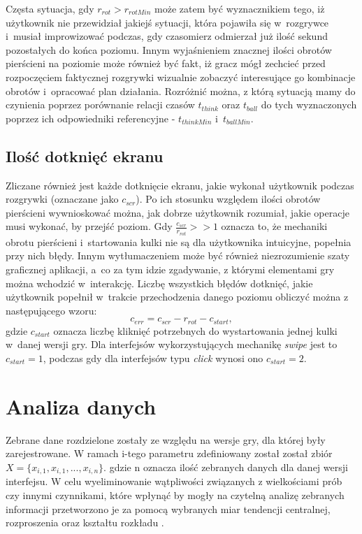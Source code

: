 \documentclass[a4paper,12pt,numbers=noenddot]{report}
\begin{document}
Częsta sytuacja, gdy $r_{rot} > r_{rotMin}$  może zatem być wyznacznikiem tego, iż użytkownik nie przewidział jakiejś sytuacji, która pojawiła się w~rozgrywce i~musiał improwizować podczas, gdy czasomierz odmierzał już ilość sekund pozostałych do końca poziomu. Innym wyjaśnieniem znacznej ilości obrotów pierścieni na poziomie może również być fakt, iż gracz mógł zechcieć przed rozpoczęciem faktycznej rozgrywki wizualnie zobaczyć interesujące go kombinacje obrotów i~opracować plan działania. Rozróżnić można, z którą sytuacją mamy do czynienia poprzez porównanie relacji czasów $t_{think}$ oraz $t_{ball}$ do tych wyznaczonych poprzez ich odpowiedniki referencyjne - $t_{thinkMin}$ i~$t_{ballMin}$.
	\subsection{Ilość dotknięć ekranu}
Zliczane również jest każde dotknięcie ekranu, jakie wykonał użytkownik podczas rozgrywki (oznaczane jako $c_{scr}$). Po ich stosunku względem ilości obrotów pierścieni wywnioskować można, jak dobrze użytkownik rozumiał, jakie operacje musi wykonać, by przejść poziom. Gdy $\frac{c_{scr}}{r_{rot}} >> 1$ oznacza to, że mechaniki obrotu pierścieni i~startowania kulki nie są dla użytkownika intuicyjne, popełnia przy nich błędy. Innym wytłumaczeniem może być również niezrozumienie szaty graficznej aplikacji, a~co za tym idzie zgadywanie, z którymi elementami gry można wchodzić w~interakcję. Liczbę wszystkich błędów dotknięć, jakie użytkownik popełnił w~trakcie przechodzenia danego poziomu obliczyć można z następującego wzoru:
\begin{equation}
\label{eq_errors}
c_{err} = c_{scr} - r_{rot} - c_{start},
\end{equation}
gdzie  $c_{start}$ oznacza liczbę kliknięć potrzebnych do wystartowania jednej kulki w~danej wersji gry. Dla interfejsów wykorzystujących mechanikę \textit{swipe} jest to $c_{start} = 1$, podczas gdy dla interfejsów typu \textit{click} wynosi ono $c_{start} = 2$.
\section{Analiza danych}
Zebrane dane rozdzielone zostały ze względu na wersje gry, dla której były zarejestrowane. W ramach i-tego parametru zdefiniowany został został zbiór $X = \{x_{i,1},x_{i,1},..., x_{i,n}\}$. gdzie n oznacza ilość zebranych danych dla danej wersji interfejsu. W celu wyeliminowanie wątpliwości związanych z wielkościami prób czy innymi czynnikami, które wpłynąć by mogły na czytelną analizę zebranych informacji przetworzono je za pomocą wybranych miar tendencji centralnej, rozproszenia oraz kształtu rozkładu \cite{online_Statistics}.
\end{document}
